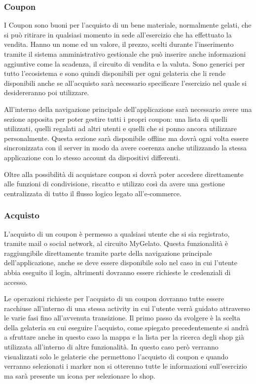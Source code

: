 \subsubsection{Coupon}
I Coupon sono buoni per l'acquisto di un bene materiale, normalmente gelati, che si può ritirare in qualsiasi momento in sede all'esercizio che ha effettuato la vendita.
Hanno un nome ed un valore, il prezzo, scelti durante l'inserimento tramite il sistema amministrativo gestionale che può inserire anche informazioni aggiuntive come la scadenza, il circuito di vendita e la valuta.
Sono generici per tutto l'ecosistema e sono quindi disponibili per ogni gelateria che li rende disponibili anche se all'acquisto sarà necessario specificare l'esercizio nel quale si desidereranno poi utilizzare.

All'interno della navigazione principale dell'applicazione sarà necessario avere una sezione apposita per poter gestire tutti i propri coupon: una lista di quelli utilizzati, quelli regalati ad altri utenti e quelli che si ponno ancora utilizzare personalmente.
Questa sezione sarà disponibile offline ma dovrà ogni volta essere sincronizzata con il server in modo da avere coerenza anche utilizzando la stessa applicazione con lo stesso account da dispositivi differenti.

Oltre alla possibilità di acquistare coupon si dovrà poter accedere direttamente alle funzioni di condivisione, riscatto e utilizzo così da avere una gestione centralizzata di tutto il flusso logico legato all'e-commerce.

\subsubsection{Acquisto}
L'acquisto di un coupon è permesso a qualsiasi utente che si sia registrato, tramite mail o social network, al circuito MyGelato.
Questa funzionalità è raggiungibile direttamente tramite parte della navigazione principale dell'applicazione, anche se deve essere disponibile solo nel caso in cui l'utente abbia eseguito il login, altrimenti dovranno essere richieste le credenziali di accesso.

Le operazioni richieste per l'acquisto di un coupon dovranno tutte essere racchiuse all'interno di una stessa activity in cui l'utente verrà guidato attraverso le varie fasi fino all'avvenuta transizione.
Il primo passo da svolgere è la scelta della gelateria su cui eseguire l'acquisto, come spiegato precedentemente si andrà a sfruttare anche in questo caso la mappa e la lista per la ricerca degli shop già utilizzata all'interno di altre funzionalità.
In questo caso però verranno visualizzati solo le gelaterie che permettono l'acquisto di coupon e quando verranno selezionati i marker non si otterenno tutte le informazioni sull'esercizio ma sarà presente un icona per selezionare lo shop.

